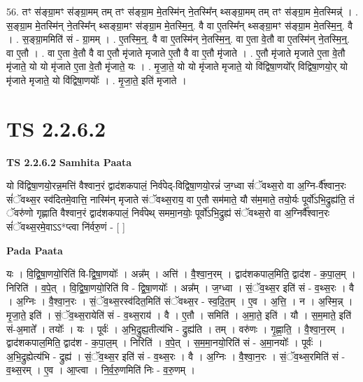 \documentclass[17pt]{extarticle}
\begin{document}
56. तꣳ स॑ङ्ग्रा॒मꣳ स॑ङ्ग्रा॒मम् तम् तꣳ स॑ङ्ग्रा॒म मे॒तस्मि॑न् ने॒तस्मि᳚न् थ्सङ्ग्रा॒मम् तम् तꣳ स॑ङ्ग्रा॒म मे॒तस्मिन्न्॑ । . स॒ङ्ग्रा॒म मे॒तस्मि॑न् ने॒तस्मि᳚न् थ्सङ्ग्रा॒मꣳ स॑ङ्ग्रा॒म मे॒तस्मि॒न्॒. वै वा ए॒तस्मि᳚न् थ्सङ्ग्रा॒मꣳ स॑ङ्ग्रा॒म मे॒तस्मि॒न्॒. वै । . स॒ङ्ग्रा॒ममिति॑ सं - ग्रा॒मम् । . ए॒तस्मि॒न्॒. वै वा ए॒तस्मि॑न् ने॒तस्मि॒न्॒. वा ए॒ता वे॒तौ वा ए॒तस्मि॑न् ने॒तस्मि॒न्॒. वा ए॒तौ । . वा ए॒ता वे॒तौ वै वा ए॒तौ मृ॑जाते मृजाते ए॒तौ वै वा ए॒तौ मृ॑जाते । . ए॒तौ मृ॑जाते मृजाते ए॒ता वे॒तौ मृ॑जाते॒ यो यो मृ॑जाते ए॒ता वे॒तौ मृ॑जाते॒ यः । . मृ॒जा॒ते॒ यो यो मृ॑जाते मृजाते॒ यो वि॑द्विषा॒णयो᳚र् विद्विषा॒णयो॒र् यो मृ॑जाते मृजाते॒ यो वि॑द्विषा॒णयोः᳚ । . मृ॒जा॒ते॒ इति॑ मृजाते । \newline
\pagebreak
{}

\section{ TS 2.2.6.2 }

\textbf{TS 2.2.6.2 } \newline
\textbf{Samhita Paata} \newline

यो वि॑द्विषा॒णयो॒रन्न॒मत्ति॑ वैश्वान॒रं द्वाद॑शकपालं॒ निर्व॑पेद्-विद्विषा॒णयो॒रन्नं॑ ज॒ग्ध्वा सं॑ॅवथ्स॒रो वा अ॒ग्नि-र्वै᳚श्वान॒रः सं॑ॅवथ्स॒र स्व॑दितमे॒वात्ति॒ नास्मि॑न् मृजाते संॅवथ्स॒राय॒ वा ए॒तौ सम॑माते॒ यौ स॑म॒माते॒ तयो॒र्यः पूर्वो॑ऽभि॒द्रुह्य॑ति॒ तं ॅवरु॑णो गृह्णाति वैश्वान॒रं द्वाद॑शकपालं॒ निर्व॑पेथ् सममा॒नयोः॒ पूर्वो॑ऽभि॒द्रुह्य॑ संॅवथ्स॒रो वा अ॒ग्निर्वै᳚श्वान॒रः सं॑ॅवथ्स॒रमे॒वाऽऽ*प्त्वा नि॑र्वरु॒णं - [  ] \newline

\textbf{Pada Paata} \newline

यः । वि॒द्वि॒षा॒णयो॒रिति॑ वि-द्वि॒षा॒णयोः᳚ । अन्न᳚म् । अत्ति॑ । वै॒श्वा॒न॒रम् । द्वाद॑शकपाल॒मिति॒ द्वाद॑श - क॒पा॒ल॒म् । निरिति॑ । व॒पे॒त् । वि॒द्वि॒षा॒णयो॒रिति॑ वि - द्वि॒षा॒णयोः᳚ । अन्न᳚म् । ज॒ग्ध्वा । सं॒ॅव॒थ्स॒र इति॑ सं - व॒थ्स॒रः । वै । अ॒ग्निः । वै॒श्वा॒न॒रः । सं॒ॅव॒थ्स॒रस्व॑दित॒मिति॑ संॅवथ्स॒र - स्व॒दि॒त॒म् । ए॒व । अ॒त्ति॒ । न । अ॒स्मि॒न्न् । मृ॒जा॒ते॒ इति॑ । सं॒ॅव॒थ्स॒रायेति॑ सं - व॒थ्स॒राय॑ । वै । ए॒तौ । समिति॑ । अ॒मा॒ते॒ इति॑ । यौ । स॒म॒माते॒ इति॑ सं-अ॒माते᳚ । तयोः᳚ । यः । पूर्वः॑ । अ॒भि॒द्रुह्य॒तीत्य॑भि - द्रुह्य॑ति । तम् । वरु॑णः । गृ॒ह्णा॒ति॒ । वै॒श्वा॒न॒रम् । द्वाद॑शकपाल॒मिति॒ द्वाद॑श - क॒पा॒ल॒म् । निरिति॑ । व॒पे॒त् । स॒म॒मा॒नयो॒रिति॑ सं - अ॒मा॒नयोः᳚ । पूर्वः॑ । अ॒भि॒द्रुह्येत्य॑भि - द्रुह्य॑ । सं॒ॅव॒थ्स॒र इति॑ सं - व॒थ्स॒रः । वै । अ॒ग्निः । वै॒श्वा॒न॒रः । सं॒ॅव॒थ्स॒रमिति॑ सं - व॒थ्स॒रम् । ए॒व । आ॒प्त्वा । नि॒र्व॒रु॒णमिति॑ निः - व॒रु॒णम् ।  \newline
\end{document}
